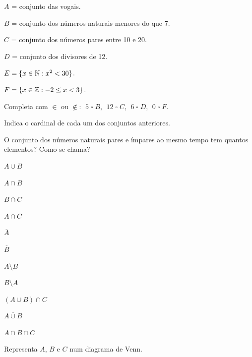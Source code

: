 \documentclass[12pt]{article}
\begin{document}


\begin{exercicios}
  \item $A$ = conjunto das vogais.
  \item $B$ = conjunto dos números naturais menores do que 7.
  \item $C$ = conjunto dos números pares entre 10 e 20.
  \item $D$ = conjunto dos divisores de 12.
  \item $E = \{x \in \mathbb{N} : x^2 < 30\}$.
  \item $F = \{x \in \mathbb{Z} : -2 \le x < 3\}$.
  \item Completa com $\in$ ou $\notin$: $\;5 \;\square\; B$, $\;12 \;\square\; C$, $\;6 \;\square\; D$, $\;0 \;\square\; F$.
  \item Indica o cardinal de cada um dos conjuntos anteriores.
  \item O conjunto dos números naturais pares e ímpares ao mesmo tempo tem quantos elementos? Como se chama?
\end{exercicios}

\begin{exercicios}
  \item $A \cup B$
  \item $A \cap B$
  \item $B \cap C$
  \item $A \cap C$
  \item $\overline{A}$
  \item $\overline{B}$
  \item $A \setminus B$
  \item $B \setminus A$
  \item $(A \cup B) \cap C$
  \item $\overline{A \cup B}$
  \item $A \cap B \cap C$
  \item Representa $A$, $B$ e $C$ num diagrama de Venn.
\end{exercicios}

\end{document}
